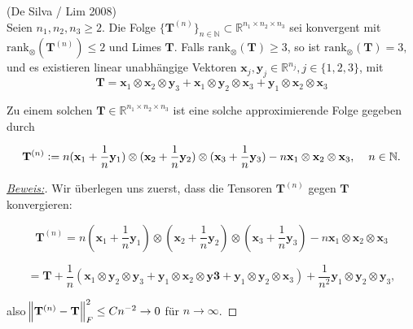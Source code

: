 \documentclass[11pt]{article} %
\begin{document}
\begin{changemargin}{0pt}{0pt}
\begin{thm} (De Silva / Lim 2008) \cite{de_silva_lim}
\\Seien $n_{1},n_{2},n_{3} \geq 2$. Die Folge $\{\mathbf{T}^{(n)}\}_{n \in \mathbb{N}} \subset \mathbb{R}^{n_{1}\times n_{2} \times n_{3}}$
sei konvergent mit $\text{rank}_{\otimes}(\mathbf{T}^{(n)}) \leq 2$ und Limes $\mathbf{T}$. Falls $\text{rank}_{\otimes}(\mathbf{T}) \geq 3$, so ist
$\text{rank}_{\otimes}(\mathbf{T}) = 3,$ und es existieren linear unabhängige Vektoren $\mathbf{x}_{j},\mathbf{y}_{j} \in \mathbb{R}^{n_{j}}, j \in
 \{1,2,3\}$, mit
\[\mathbf{T} = \mathbf{x}_{1} \otimes \mathbf{x}_{2} \otimes \mathbf{y}_{3} + \mathbf{x}_{1} \otimes \mathbf{y}_{2} \otimes \mathbf{x}_{3}
+ \mathbf{y}_{1} \otimes \mathbf{x}_{2} \otimes \mathbf{x}_{3}\]

Zu einem solchen $\mathbf{T} \in \mathbb{R}^{n_{1}\times n_{2}\times n_{3}}$ ist eine solche approximierende Folge gegeben durch

\[ \mathbf{T}^{(n)} := n(\mathbf{x}_{1} + \frac{1}{n} \mathbf{y}_{1}) \otimes (\mathbf{x}_{2} + \frac{1}{n}\mathbf{y}_{2}) \otimes
 (\mathbf{x}_{3} + \frac{1}{n}\mathbf{y}_{3}) -n\mathbf{x}_{1}\otimes \mathbf{x}_{2} \otimes \mathbf{x}_{3},\hspace{4mm} n \in \mathbb{N}.\]
\end{thm}

\begin{proof}[\underline{Beweis:}\nopunct]
Wir überlegen uns zuerst, dass die Tensoren $\mathbf{T}^{(n)}$ gegen $\mathbf{T}$ konvergieren:

\[ \mathbf{T}^{(n)} =  n(\mathbf{x}_{1} + \frac{1}{n} \mathbf{y}_{1}) \otimes (\mathbf{x}_{2} + \frac{1}{n}\mathbf{y}_{2}) \otimes
 (\mathbf{x}_{3} + \frac{1}{n}\mathbf{y}_{3}) -n\mathbf{x}_{1}\otimes \mathbf{x}_{2} \otimes \mathbf{x}_{3} \]

\[= \mathbf{T} + \frac{1}{n}(\mathbf{x}_{1} \otimes \mathbf{y}_{2} \otimes \mathbf{y}_{3} + \mathbf{y}_{1} \otimes \mathbf{x}_{2}
 \otimes \mathbf{y3} + \mathbf{y}_{1} \otimes \mathbf{y}_{2} \otimes \mathbf{x}_{3}) + \frac{1}{n^{2}}\mathbf{y}_{1}\otimes \mathbf{y}_{2} \otimes
\mathbf{y}_{3}, \]

also $\norm{\mathbf{T}^{(n)} - \mathbf{T}}^{2}_{F} \leq Cn^{-2} \rightarrow 0$ für $n \rightarrow \infty$.


\end{proof}
\end{changemargin}
\end{document}
